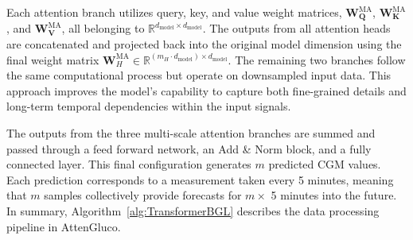 Each attention branch utilizes query, key, and value weight matrices, \( \mathbf{W}_{\mathbf{Q}}^{\text{MA}} \), \( \mathbf{W}_{\mathbf{K}}^{\text{MA}} \), and \( \mathbf{W}_{\mathbf{V}}^{\text{MA}} \), all belonging to \( \mathbb{R} ^{d_{\text{model}}\times d_{\text{model}}} \). The outputs from all attention heads are concatenated and projected back into the original model dimension using the final weight matrix \( \mathbf{W}_H^{\text{MA}} \in \mathbb{R}^{(m_H \cdot d_{\text{model}}) \times d_{\text{model}}} \). The remaining two branches follow the same computational process but operate on downsampled input data. This approach improves the model’s capability to capture both fine-grained details and long-term temporal dependencies within the input signals.

The outputs from the three multi-scale attention branches are summed and passed through a feed forward network, an Add \& Norm block, and a fully connected layer. This final configuration generates \( m \) predicted CGM values. Each prediction corresponds to a measurement taken every 5 minutes, meaning that \( m \) samples collectively provide forecasts for \( m \times \) 5 minutes into the future. In summary, Algorithm~\ref{alg:TransformerBGL} describes the data processing pipeline in AttenGluco.

